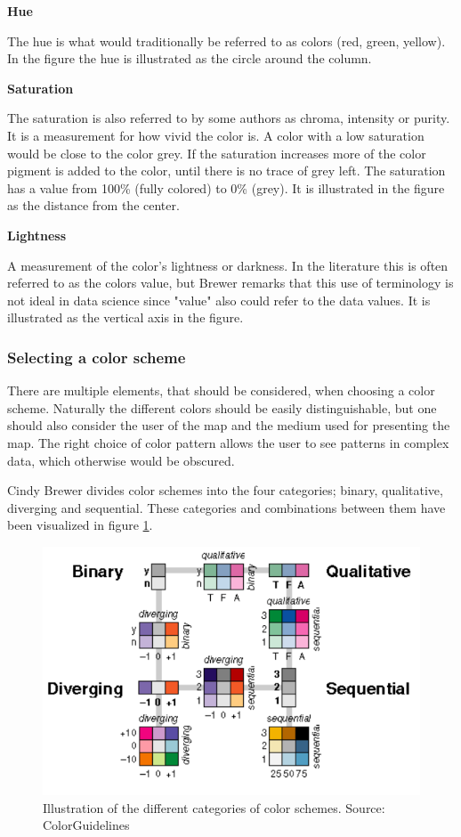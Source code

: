 \textbf{Hue}

The hue is what would traditionally be referred to as colors (red, green, yellow). In the figure the hue is illustrated as the circle around the column.

\textbf{Saturation}

The saturation is also referred to by some authors as chroma, intensity or purity. It is a measurement for how vivid the color is. A color with a low saturation would be close to the color grey. If the saturation increases more of the color pigment is added to the color, until there is no trace of grey left. The saturation has a value from 100\% (fully colored) to 0\% (grey). It is illustrated in the figure as the distance from the center.

\textbf{Lightness}

A measurement of the color’s lightness or darkness. In the literature this is often referred to as the colors value, but Brewer remarks that this use of terminology is not ideal in data science since "value" also could refer to the data values. It is illustrated as the vertical axis in the figure.  \citep{Dent}

 
\subsubsection{Selecting a color scheme}
There are multiple elements, that should be considered, when choosing a color scheme.
Naturally the different colors should be easily distinguishable, but one should also consider the user of the map and the medium used for presenting the map. The right choice of color pattern allows the user to see patterns in complex data, which otherwise would be obscured. 


Cindy Brewer divides color schemes into the four categories; binary, qualitative, diverging and sequential. These categories and combinations between them have been visualized in figure \ref{BrewerDataTypes}. \citep{Brewer94}

\begin{figure} [H]
	\centering
	\includegraphics[width=.8\textwidth]{Pictures/BrewerDataTypes}
	\caption{Illustration of the different categories of color schemes. Source: ColorGuidelines}
	\label{BrewerDataTypes}
\end{figure}
 

